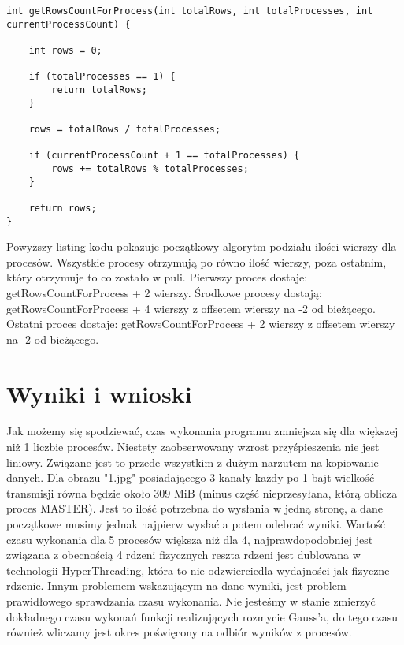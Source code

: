 \documentclass[a4paper,12pt]{article}
\begin{document}
	\begin{lstlisting}[caption=Funkcja dzieląca procesy.=Row pointery]	
int getRowsCountForProcess(int totalRows, int totalProcesses, int currentProcessCount) {

	int rows = 0;

	if (totalProcesses == 1) {
		return totalRows;
	}

	rows = totalRows / totalProcesses;

	if (currentProcessCount + 1 == totalProcesses) {
		rows += totalRows % totalProcesses;
	}

	return rows;
}		
		\end{lstlisting}

Powyższy listing kodu pokazuje początkowy algorytm podziału ilości wierszy dla procesów. 
Wszystkie procesy otrzymują po równo ilość wierszy, poza ostatnim, który otrzymuje to co zostało w puli. 
Pierwszy proces  dostaje: getRowsCountForProcess + 2 wierszy. 
Środkowe procesy dostają: getRowsCountForProcess + 4 wierszy z offsetem wierszy na -2 od bieżącego.
Ostatni  proces  dostaje: getRowsCountForProcess + 2 wierszy z offsetem wierszy na -2 od bieżącego.

\section*{Wyniki i wnioski}

     Jak możemy się spodziewać, czas wykonania programu zmniejsza się dla większej niż 1 liczbie procesów. 
     Niestety zaobserwowany wzrost przyśpieszenia nie jest liniowy. Związane jest to przede wszystkim z dużym narzutem 
     na kopiowanie danych. Dla obrazu "1.jpg" posiadającego 3 kanały każdy po 1 bajt wielkość transmisji równa będzie około 309 MiB
      (minus część nieprzesyłana, którą oblicza proces MASTER). Jest to ilość potrzebna do wysłania w jedną stronę, 
      a dane początkowe musimy jednak najpierw wysłać a potem odebrać wyniki. 
      Wartość czasu wykonania dla 5 procesów większa niż dla 4, najprawdopodobniej jest związana z obecnością 4 rdzeni fizycznych 
      reszta rdzeni jest dublowana w technologii HyperThreading, która to nie odzwierciedla wydajności jak fizyczne rdzenie. 
      Innym problemem wskazującym na dane wyniki, jest problem prawidłowego sprawdzania czasu wykonania. 
      Nie jesteśmy w stanie zmierzyć dokładnego czasu wykonań funkcji realizujących rozmycie Gauss'a, do tego czasu również wliczamy 
      jest okres poświęcony na odbiór wyników z procesów.
     
\end{document}
